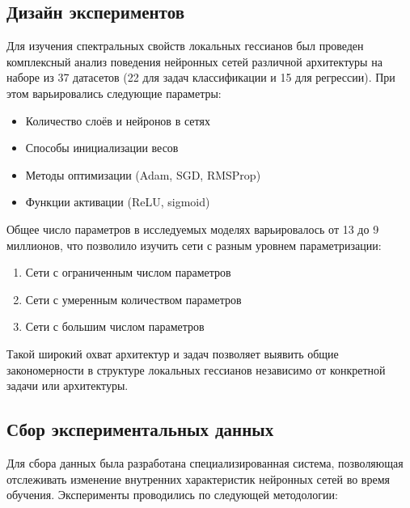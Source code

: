 \documentclass[a4paper,12pt]{article}
\begin{document}
\subsection{Дизайн экспериментов}

Для изучения спектральных свойств локальных гессианов был проведен комплексный анализ поведения нейронных
сетей различной архитектуры на наборе из 37 датасетов (22 для задач классификации и 15 для регрессии). При
этом варьировались следующие параметры:

\begin{itemize}
  \item Количество слоёв и нейронов в сетях
  \item Способы инициализации весов
  \item Методы оптимизации (Adam, SGD, RMSProp)
  \item Функции активации (ReLU, sigmoid)
\end{itemize}

Общее число параметров в исследуемых моделях варьировалось от 13 до 9 миллионов, что позволило изучить сети с
разным уровнем параметризации:
\begin{enumerate}
  \item Сети с ограниченным числом параметров
  \item Сети с умеренным количеством параметров
  \item Сети с большим числом параметров
\end{enumerate}

Такой широкий охват архитектур и задач позволяет выявить общие закономерности в структуре локальных гессианов
независимо от конкретной задачи или архитектуры.

\subsection{Сбор экспериментальных данных}

Для сбора данных была разработана специализированная система, позволяющая отслеживать изменение внутренних
характеристик нейронных сетей во время обучения. Эксперименты проводились по следующей методологии:
\end{document}
